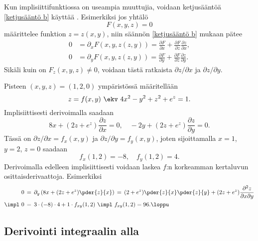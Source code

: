 Kun implisiittifunktiossa on useampia muuttujia, voidaan ketjusääntöä \eqref{ketjusääntö b} 
käyttää . Esimerkiksi jos yhtälö
\[
F(x,y,z)=0
\]
määrittelee funktion $z=z(x,y)$, niin säännön \eqref{ketjusääntö b} mukaan pätee
\begin{align*}
0 &= \partial_x F(x,y,z(z,y))=\frac{\partial F}{\partial x} + \frac{\partial F}{\partial z}
\frac{\partial z}{\partial x}, \\
0 &= \partial_y F(x,y,z(z,y))=\frac{\partial F}{\partial y} + \frac{\partial F}{\partial z}
\frac{\partial z}{\partial y}.
\end{align*}
Sikäli kuin on $F_z(x,y,z) \neq 0$, voidaan tästä ratkaista $\partial z/\partial x$ ja
$\partial z/\partial y$.
\begin{Exa} Pisteen $(x,y,z)=(1,2,0)$ ympäristössä määritellään
\[
z=f(x,y) \ \ekv \ 4x^2-y^2+z^2+e^z=1.
\]
Implisiittisesti derivoimalla saadaan
\[
8x+(2z+e^z)\frac{\partial z}{\partial x} = 0,\quad 
-2y+(2z+e^z)\frac{\partial z}{\partial y} = 0.
\]
Tässä on $\partial z / \partial x = f_x(x,y)$ ja $\partial z / \partial y = f_y(x,y)$, joten 
sijoittamalla $x=1$, $y=2$, $z=0$ saadaan
\[
f_x(1,2)=-8,\quad f_y(1,2)=4.
\]
Derivoimalla edelleen implisiittisesti voidaan laskea $f$:n korkeamman kertaluvun 
osittaisderivaattoja. Esimerkiksi
\begin{align*}
0\,&=\,\partial_y\left(8x+(2z+e^z)\pder{z}{x}\right)\,
    =\,(2+e^z)\pder{z}{x}\pder{z}{y}+(2z+e^z)\frac{\partial^2 z}{\partial x \partial y} \\
\impl\ 
    0\,&=\,3\cdot(-8)\cdot 4 + 1\cdot f_{xy}(1,2)\ \impl\ f_{xy}(1,2)= 96. \loppu
\end{align*}
\end{Exa}

\subsection{Derivointi integraalin alla}

